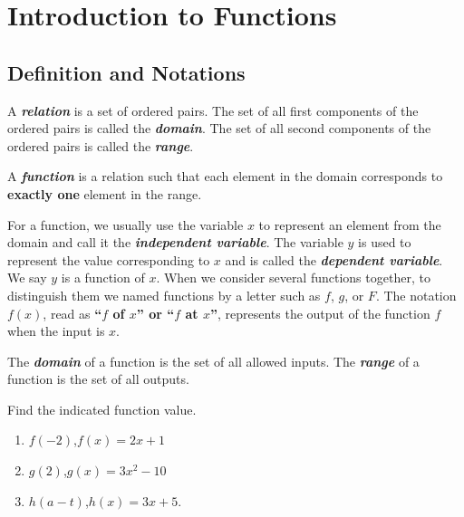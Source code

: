 
\hypertarget{introduction-to-functions}{%
\section{Introduction to Functions}\label{introduction-to-functions}}

\hypertarget{definition-and-notations}{%
\subsection{Definition and Notations}\label{definition-and-notations}}

A \textbf{\emph{relation}} is a set of ordered pairs. The set of all
first components of the ordered pairs is called the
\textbf{\emph{domain}}. The set of all second components of the ordered
pairs is called the \textbf{\emph{range}}.

A \textbf{\emph{function}} is a relation such that each element in the
domain corresponds to \textbf{exactly one} element in the range.

For a function, we usually use the variable \(x\) to represent an
element from the domain and call it the \textbf{\emph{independent
variable}}. The variable \(y\) is used to represent the value
corresponding to \(x\) and is called the \textbf{\emph{dependent
variable}}. We say \(y\) is a function of \(x\). When we consider
several functions together, to distinguish them we named functions by a
letter such as \(f\), \(g\), or \(F\). The notation \(f(x)\), read as
\textbf{``\(f\) of \(x\)'' or ``\(f\) at \(x\)''}, represents the output
of the function \(f\) when the input is \(x\).

The \textbf{\emph{domain}} of a function is the set of all allowed inputs. The \textbf{\emph{range}} of
a function is the set of all outputs.

\begin{example}

Find the indicated function value.

\begin{enumerate}[itemsep = 3.5\baselineskip]
\item
  \(f(-2)\),\quad \(f(x)=2x+1\)
\item
  \(g(2)\),\quad \(g(x)=3x^2-10\)
\item
  \(h(a-t)\),\quad \(h(x)=3x+5\).
\end{enumerate}

\end{example}


